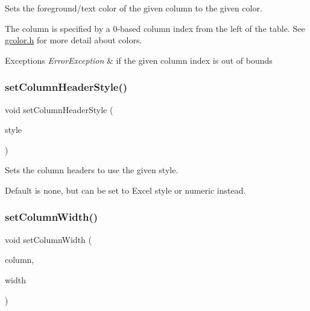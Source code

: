 Sets the foreground/text color of the given column to the given color. 

The column is specified by a 0-\/based column index from the left of the table. See \mbox{\hyperlink{gcolor_8h_source}{gcolor.\+h}} for more detail about colors. 
\begin{DoxyExceptions}{Exceptions}
{\em Error\+Exception} & if the given column index is out of bounds \\
\hline
\end{DoxyExceptions}
\mbox{\label{classGTable_ac97cb91256925fa81c52594bca854969}} 
\subsubsection{\texorpdfstring{set\+Column\+Header\+Style()}{setColumnHeaderStyle()}}
{\footnotesize\ttfamily void set\+Column\+Header\+Style (\begin{DoxyParamCaption}\item[{\mbox{\hyperlink{classGTable_a060cff504451bbb98530e64e936e2671}{G\+Table\+::\+Column\+Header\+Style}}}]{style }\end{DoxyParamCaption})\hspace{0.3cm}{\ttfamily [virtual]}}



Sets the column headers to use the given style. 

Default is none, but can be set to Excel style or numeric instead. \mbox{\label{classGTable_a52075dc231c73a896bcef426047fd327}} 
\subsubsection{\texorpdfstring{set\+Column\+Width()}{setColumnWidth()}}
{\footnotesize\ttfamily void set\+Column\+Width (\begin{DoxyParamCaption}\item[{int}]{column,  }\item[{double}]{width }\end{DoxyParamCaption})\hspace{0.3cm}{\ttfamily [virtual]}}



